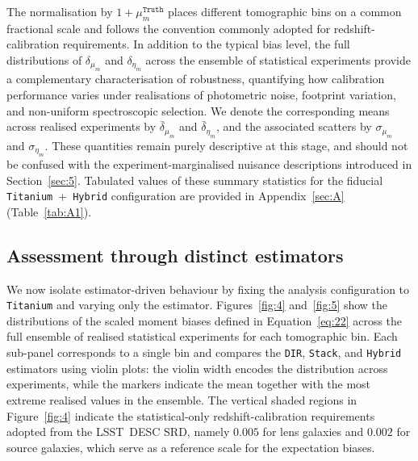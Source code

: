 The normalisation by \(1 + \mu_m^{\texttt{Truth}}\) places different tomographic bins on a common fractional scale and follows the convention commonly adopted for redshift-calibration requirements. In addition to the typical bias level, the full distributions of \(\delta_{\mu_m}\) and \(\delta_{\eta_m}\) across the ensemble of statistical experiments provide a complementary characterisation of robustness, quantifying how calibration performance varies under realisations of photometric noise, footprint variation, and non-uniform spectroscopic selection. We denote the corresponding means across realised experiments by \(\bar{\delta}_{\mu_m}\) and \(\bar{\delta}_{\eta_m}\), and the associated scatters by \(\sigma_{\mu_m}\) and \(\sigma_{\eta_m}\). These quantities remain purely descriptive at this stage, and should not be confused with the experiment-marginalised nuisance descriptions introduced in Section~\ref{sec:5}. Tabulated values of these summary statistics for the fiducial \texttt{Titanium}~+~\texttt{Hybrid} configuration are provided in Appendix~\ref{sec:A} (Table~\ref{tab:A1}).

\subsection{Assessment through distinct estimators} \label{sec:4.3}

We now isolate estimator-driven behaviour by fixing the analysis configuration to \texttt{Titanium} and varying only the estimator. Figures~\ref{fig:4} and~\ref{fig:5} show the distributions of the scaled moment biases defined in Equation~\ref{eq:22} across the full ensemble of realised statistical experiments for each tomographic bin. Each sub-panel corresponds to a single bin and compares the \texttt{DIR}, \texttt{Stack}, and \texttt{Hybrid} estimators using violin plots: the violin width encodes the distribution across experiments, while the markers indicate the mean together with the most extreme realised values in the ensemble. The vertical shaded regions in Figure~\ref{fig:4} indicate the statistical-only redshift-calibration requirements adopted from the LSST~DESC SRD, namely \(0.005\) for lens galaxies and \(0.002\) for source galaxies, which serve as a reference scale for the expectation biases.


